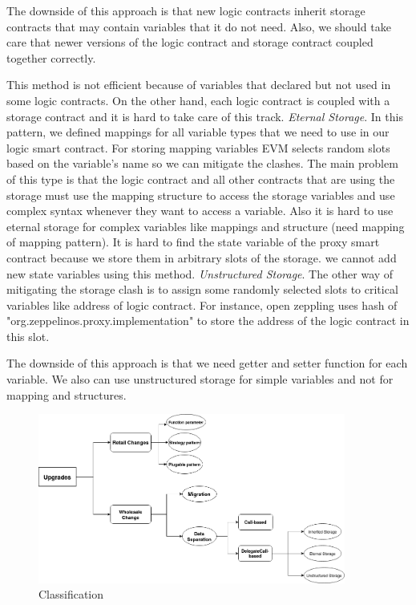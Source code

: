 The downside of this approach is that new logic contracts inherit storage contracts that may contain variables that it do not need. Also, we should take care that newer versions of the logic contract and storage contract coupled together correctly.

This method is not efficient because of variables that declared but not used in some logic contracts. On the other hand, each logic contract is coupled with a storage contract and it is hard to take care of this track. 
\textit{Eternal Storage}. 
In this pattern, we defined mappings for all variable types that we need to use in our logic smart contract. For storing mapping variables EVM selects random slots based on the variable's name so we can mitigate the clashes.
The main problem of this type is that the logic contract and all other contracts that are using the storage must use the mapping structure to access the storage variables and use complex syntax whenever they want to access a variable.
Also it is hard to use eternal storage for complex variables like mappings and structure (need mapping of mapping pattern).
It is hard to find the state variable of the proxy smart contract because we store them in arbitrary slots of the storage. we cannot add new state variables using this method.
\textit{Unstructured Storage}. 
The other way of mitigating the storage clash is to assign some randomly selected slots to critical variables like address of logic contract. For instance, open zeppling uses hash of "org.zeppelinos.proxy.implementation" to store the address of the logic contract in this slot.

The downside of this approach is that we need getter and setter function for each variable. We also can use unstructured storage for simple variables and not for mapping and structures.

\begin{figure}
  \centering
    
      \includegraphics[width=0.9\textwidth]{figures/Chart.png}
  \caption{Classification}
 \end{figure}


